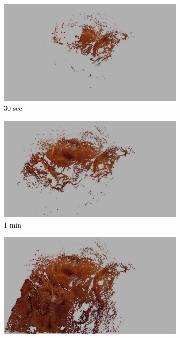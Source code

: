 \documentclass[conf]{new-aiaa}
\begin{document}
\begin{figure}[!t]
	\centering
	\begin{subfigure}[t]{0.49\columnwidth}
           	\centering
          	\includegraphics[height=0.5\textwidth]{FullMarsMap30sec.jpg}
        		\caption{$30$ sec}
		\vspace*{0.025\textwidth}
    	\end{subfigure}
    	\begin{subfigure}[t]{0.49\columnwidth}
           	\centering
          	\includegraphics[height=0.5\textwidth]{FullMarsMap1min.jpg}
        		\caption{$1$ min}
		\vspace*{0.025\textwidth}
    	\end{subfigure}
	\centering
	\begin{subfigure}[t]{0.49\columnwidth}
           	\centering
          	\includegraphics[height=0.5\textwidth]{FullMarsMap2min.jpg}

\end{subfigure}
\end{figure}
\end{document}
